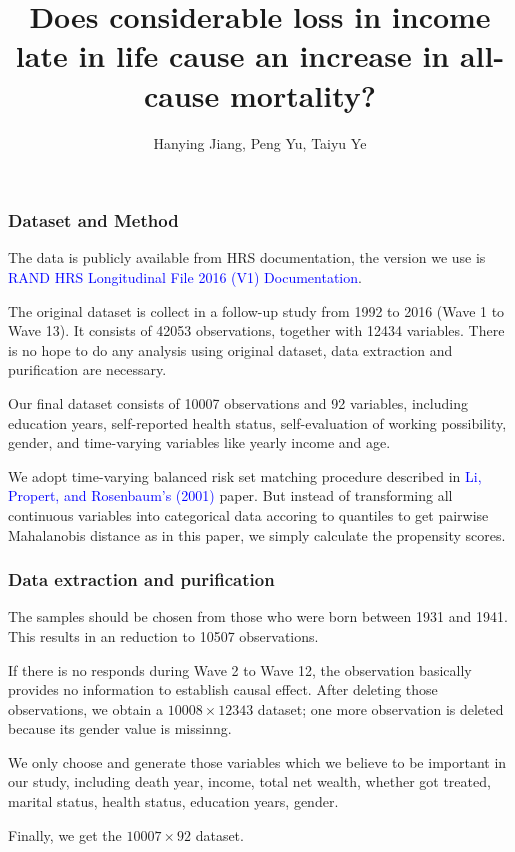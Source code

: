 \documentclass[10pt, handout]{beamer} %
\title[Deep neural networks]
{Does considerable loss in income late in life cause an increase in all-cause mortality? }
\author[J.H, Y.P, Y.T]
{\normalsize Hanying Jiang, Peng Yu, Taiyu Ye}
\institute[]%
{
Department of Statistics \\
University of Wisconsin-Madison \\
\vskip 0.1in

\vskip 0.05in

}
\date[12/03/2019] %
\newcommand{\cblue}   {\textcolor {blue}}
\begin{document}
\begin{frame}
\titlepage %
\end{frame}

\frame
{
\frametitle{Dataset and Method}
\vskip 0.1in
\begin{itemize}
{
\item The data is publicly available from HRS documentation, the version we use is \cblue{RAND HRS Longitudinal File 2016 (V1) Documentation}.


\vskip 0.1in

\item The original dataset is collect in a follow-up study from 1992 to 2016 (Wave 1 to Wave 13). It consists of 42053 observations, together with 12434 variables. There is no hope to do any analysis using original dataset, data extraction and purification are necessary. 

\vskip 0.1in

\item Our final dataset consists of 10007 observations and 92 variables, including education years, self-reported health status, self-evaluation of working possibility, gender, and time-varying variables like yearly income and age.

\vskip 0.1in

\item We adopt time-varying balanced risk set matching procedure described in \cblue{ Li, Propert, and Rosenbaum's (2001)} paper. But instead of transforming all continuous variables into categorical data accoring to quantiles to get pairwise Mahalanobis distance as in this paper, we simply calculate the propensity scores.

}
\end{itemize}
}

\frame
{
\frametitle{Data extraction and purification}
\vskip 0.1in
\begin{itemize}
{
\item The samples should be chosen from those who were born between 1931 and 1941. This results in an reduction to 10507 observations.

\vskip 0.1in

\item If there is no responds during Wave 2 to Wave 12, the observation basically provides no information to establish causal effect. After deleting those observations, we obtain a $10008\times 12343$ dataset; one more observation is deleted because its gender value is missinng.

\vskip 0.1in

\item We only choose and generate those variables which we believe to be important in our study, including death year, income, total net wealth, whether got treated, marital status, health status, education years, gender.

\vskip 0.1in

\item Finally, we get the $10007\times 92$ dataset.

}
\end{itemize}
}
\end{document}
